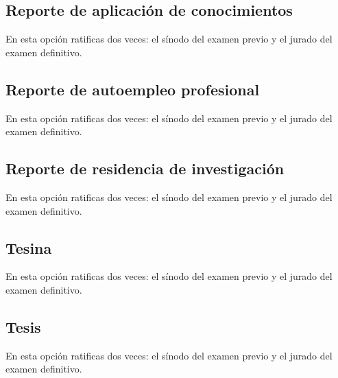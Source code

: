 \subsection{Reporte de aplicación de conocimientos}
En esta opción ratificas dos veces: el sínodo del examen previo y el jurado del examen definitivo.
\subsection{Reporte de autoempleo profesional}
En esta opción ratificas dos veces: el sínodo del examen previo y el jurado del examen definitivo.
\subsection{Reporte de residencia de investigación}
En esta opción ratificas dos veces: el sínodo del examen previo y el jurado del examen definitivo.
\subsection{Tesina}
En esta opción ratificas dos veces: el sínodo del examen previo y el jurado del examen definitivo.
\subsection{Tesis}
En esta opción ratificas dos veces: el sínodo del examen previo y el jurado del examen definitivo.
